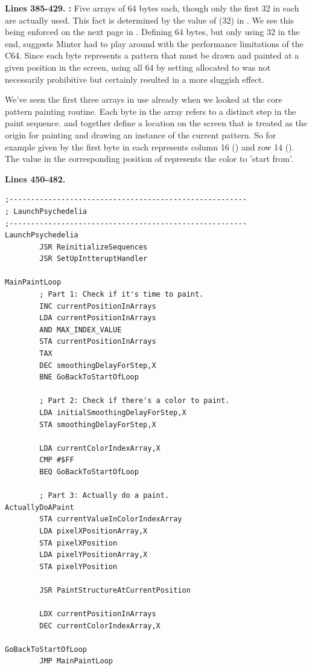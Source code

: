 \textbf{Lines 385-429. :} Five arrays of 64 bytes each, though only the first 32 in each are actually used. This fact is determined
by the value of  (32) in . We see this being enforced on the next page in
. Defining 64 bytes, but only using 32 in the end, suggests Minter had to play around
with the performance limitations of the C64. Since each byte represents a pattern that must be drawn and painted
at a given position in the screen, using all 64 by setting allocated  to  
was not necessarily prohibitive but certainly resulted in a more sluggish effect.

We've seen the first three arrays in use already when we looked at the core
pattern painting routine. Each byte in the array refers to a distinct step in the paint sequence.
 and  together define a location on the screen
that is treated as the origin for painting and drawing an instance of the current pattern. So for example  given by the
first byte in each represents column 16 () and row 14 (). The value in
the corresponding position of  represents the color to 'start from'.


\clearpage
\textbf{Lines 450-482. }
\begin{lstlisting}[caption= The game's main loop.]
;-------------------------------------------------------
; LaunchPsychedelia
;-------------------------------------------------------
LaunchPsychedelia   
        JSR ReinitializeSequences
        JSR SetUpIntteruptHandler

MainPaintLoop   
        ; Part 1: Check if it's time to paint.
        INC currentPositionInArrays
        LDA currentPositionInArrays
        AND MAX_INDEX_VALUE
        STA currentPositionInArrays
        TAX 
        DEC smoothingDelayForStep,X
        BNE GoBackToStartOfLoop

        ; Part 2: Check if there's a color to paint.
        LDA initialSmoothingDelayForStep,X
        STA smoothingDelayForStep,X

        LDA currentColorIndexArray,X
        CMP #$FF
        BEQ GoBackToStartOfLoop

        ; Part 3: Actually do a paint.
ActuallyDoAPaint
        STA currentValueInColorIndexArray
        LDA pixelXPositionArray,X
        STA pixelXPosition
        LDA pixelYPositionArray,X
        STA pixelYPosition

        JSR PaintStructureAtCurrentPosition

        LDX currentPositionInArrays
        DEC currentColorIndexArray,X

GoBackToStartOfLoop   
        JMP MainPaintLoop

\end{lstlisting}

